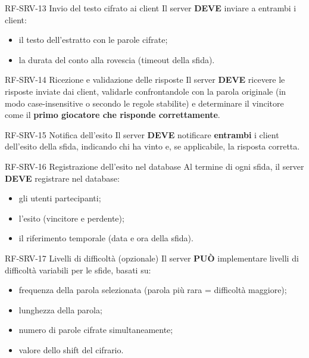 \documentclass[12pt, a4paper]{article}
\newcommand{\mustshall}{\textbf{DEVE}}
\newcommand{\may}{\textbf{PUÒ}}
\begin{document}
\begin{reqbox}{RF-SRV-13 \quad Invio del testo cifrato ai client \quad [MUST]}
Il server \mustshall{} inviare a entrambi i client:
\begin{itemize}
    \item il testo dell'estratto con le parole cifrate;
    \item la durata del conto alla rovescia (timeout della sfida).
\end{itemize}
\end{reqbox}

\begin{reqbox}{RF-SRV-14 \quad Ricezione e validazione delle risposte \quad [MUST]}
Il server \mustshall{} ricevere le risposte inviate dai client, validarle confrontandole con la parola originale (in modo case-insensitive o secondo le regole stabilite) e determinare il vincitore come il \textbf{primo giocatore che risponde correttamente}.
\end{reqbox}

\begin{reqbox}{RF-SRV-15 \quad Notifica dell'esito \quad [MUST]}
Il server \mustshall{} notificare \textbf{entrambi} i client dell'esito della sfida, indicando chi ha vinto e, se applicabile, la risposta corretta.
\end{reqbox}

\begin{reqbox}{RF-SRV-16 \quad Registrazione dell'esito nel database \quad [MUST]}
Al termine di ogni sfida, il server \mustshall{} registrare nel database:
\begin{itemize}
    \item gli utenti partecipanti;
    \item l'esito (vincitore e perdente);
    \item il riferimento temporale (data e ora della sfida).
\end{itemize}
\end{reqbox}

\begin{reqbox}{RF-SRV-17 \quad Livelli di difficoltà (opzionale) \quad [MAY]}
Il server \may{} implementare livelli di difficoltà variabili per le sfide, basati su:
\begin{itemize}
    \item frequenza della parola selezionata (parola più rara = difficoltà maggiore);
    \item lunghezza della parola;
    \item numero di parole cifrate simultaneamente;
    \item valore dello shift del cifrario.
\end{itemize}
\end{reqbox}
\end{document}
